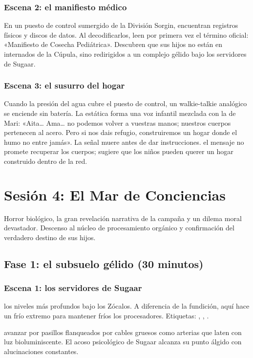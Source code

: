 \subsubsection{Escena 2: el manifiesto médico}
En un puesto de control sumergido de la División Sorgin, encuentran registros físicos y discos de datos. Al decodificarlos, leen por primera vez el término oficial: «Manifiesto de Cosecha Pediátrica». Descubren que sus hijos no están en internados de la Cúpula, sino redirigidos a un complejo gélido bajo los servidores de Sugaar.

\subsubsection{Escena 3: el susurro del hogar}
Cuando la presión del agua cubre el puesto de control, un walkie-talkie analógico se enciende sin batería. La estática forma una voz infantil mezclada con la de Mari: «Aita\ldots{} Ama\ldots{} no podemos volver a vuestras manos; nuestros cuerpos pertenecen al acero. Pero si nos dais refugio, construiremos un hogar donde el humo no entre jamás». La señal muere antes de dar instrucciones.
 el mensaje no promete recuperar los cuerpos; sugiere que los niños pueden querer un hogar construido dentro de la red.

\section{Sesión 4: El Mar de Conciencias}


 Horror biológico, la gran revelación narrativa de la campaña y un dilema moral devastador. Descenso al núcleo de procesamiento orgánico y confirmación del verdadero destino de sus hijos.

\subsection{Fase 1: el subsuelo gélido (30 minutos)}

\subsubsection{Escena 1: los servidores de Sugaar}
 los niveles más profundos bajo los Zócalos. A diferencia de la fundición, aquí hace un frío extremo para mantener fríos los procesadores. Etiquetas: , , .\par
{} avanzar por pasillos flanqueados por cables gruesos como arterias que laten con luz bioluminiscente. El acoso psicológico de Sugaar alcanza su punto álgido con alucinaciones constantes.

